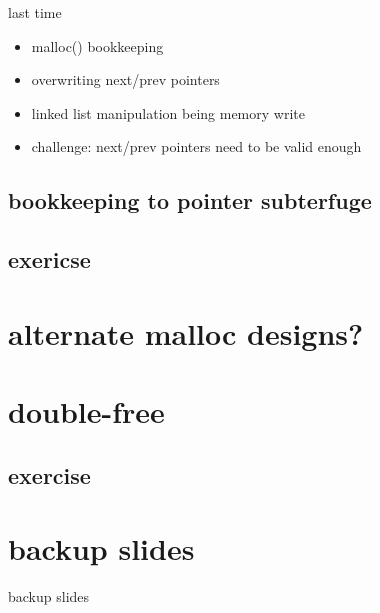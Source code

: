 \date{}
\title{}
\date{}

\begin{frame}
    \titlepage
\end{frame}



\begin{frame}{last time}
    \begin{itemize}
    \item malloc() bookkeeping
    \item overwriting next/prev pointers
    \item linked list manipulation being memory write
    \item challenge: next/prev pointers need to be valid enough
    \end{itemize}
\end{frame}

\subsection{bookkeeping to pointer subterfuge}


\subsection{exericse}


\section{alternate malloc designs?}


\section{double-free}


\subsection{exercise}






\section{backup slides}
\begin{frame}{backup slides}
\end{frame}


